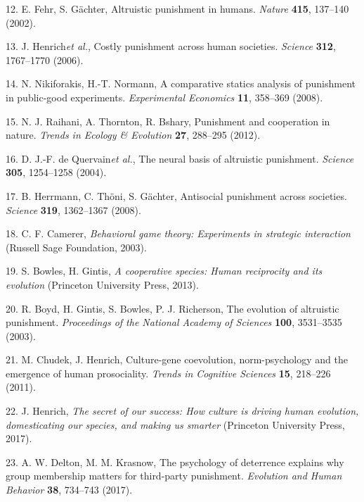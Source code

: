 \documentclass[
  english,
  man, donotrepeattitle,floatsintext]{apa6}
\newenvironment{cslreferences}%
  {}%
  {\par}
\begin{document}
\begin{cslreferences}
\leavevmode\hypertarget{ref-Fehr2002}{}%
12. E. Fehr, S. Gächter, Altruistic punishment in humans. \emph{Nature} \textbf{415}, 137--140 (2002).

\leavevmode\hypertarget{ref-Henrich2006}{}%
13. J. Henrich\emph{et al.}, Costly punishment across human societies. \emph{Science} \textbf{312}, 1767--1770 (2006).

\leavevmode\hypertarget{ref-Nikiforakis2008a}{}%
14. N. Nikiforakis, H.-T. Normann, A comparative statics analysis of punishment in public-good experiments. \emph{Experimental Economics} \textbf{11}, 358--369 (2008).

\leavevmode\hypertarget{ref-Raihani2012a}{}%
15. N. J. Raihani, A. Thornton, R. Bshary, Punishment and cooperation in nature. \emph{Trends in Ecology \& Evolution} \textbf{27}, 288--295 (2012).

\leavevmode\hypertarget{ref-DeQuervain2004}{}%
16. D. J.-F. de Quervain\emph{et al.}, The neural basis of altruistic punishment. \emph{Science} \textbf{305}, 1254--1258 (2004).

\leavevmode\hypertarget{ref-Herrmann2008}{}%
17. B. Herrmann, C. Thöni, S. Gächter, Antisocial punishment across societies. \emph{Science} \textbf{319}, 1362--1367 (2008).

\leavevmode\hypertarget{ref-Camerer2003}{}%
18. C. F. Camerer, \emph{Behavioral game theory: Experiments in strategic interaction} (Russell Sage Foundation, 2003).

\leavevmode\hypertarget{ref-Bowles2013}{}%
19. S. Bowles, H. Gintis, \emph{A cooperative species: Human reciprocity and its evolution} (Princeton University Press, 2013).

\leavevmode\hypertarget{ref-Boyd2003}{}%
20. R. Boyd, H. Gintis, S. Bowles, P. J. Richerson, The evolution of altruistic punishment. \emph{Proceedings of the National Academy of Sciences} \textbf{100}, 3531--3535 (2003).

\leavevmode\hypertarget{ref-Chudek2011}{}%
21. M. Chudek, J. Henrich, Culture-gene coevolution, norm-psychology and the emergence of human prosociality. \emph{Trends in Cognitive Sciences} \textbf{15}, 218--226 (2011).

\leavevmode\hypertarget{ref-Henrich2017}{}%
22. J. Henrich, \emph{The secret of our success: How culture is driving human evolution, domesticating our species, and making us smarter} (Princeton University Press, 2017).

\leavevmode\hypertarget{ref-Delton2017}{}%
23. A. W. Delton, M. M. Krasnow, The psychology of deterrence explains why group membership matters for third-party punishment. \emph{Evolution and Human Behavior} \textbf{38}, 734--743 (2017).


\end{cslreferences}
\end{document}
